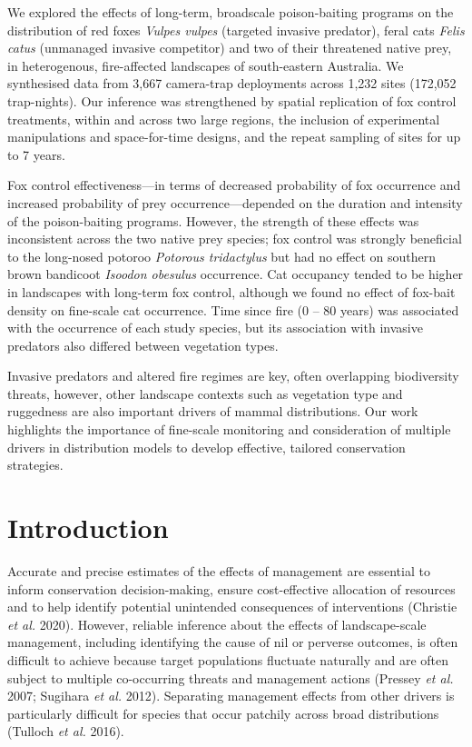 \documentclass[11pt,a4paper,titlepage,twoside,openright]{style/unimelbthesis}
\begin{document}
\begin{mainmatter}
We explored the effects of long-term, broadscale poison-baiting programs on the distribution of red foxes \emph{Vulpes vulpes} (targeted invasive predator), feral cats \emph{Felis catus} (unmanaged invasive competitor) and two of their threatened native prey, in heterogenous, fire-affected landscapes of south-eastern Australia. We synthesised data from 3,667 camera-trap deployments across 1,232 sites (172,052 trap-nights). Our inference was strengthened by spatial replication of fox control treatments, within and across two large regions, the inclusion of experimental manipulations and space-for-time designs, and the repeat sampling of sites for up to 7 years.

Fox control effectiveness---in terms of decreased probability of fox occurrence and increased probability of prey occurrence---depended on the duration and intensity of the poison-baiting programs. However, the strength of these effects was inconsistent across the two native prey species; fox control was strongly beneficial to the long-nosed potoroo \emph{Potorous tridactylus} but had no effect on southern brown bandicoot \emph{Isoodon obesulus} occurrence. Cat occupancy tended to be higher in landscapes with long-term fox control, although we found no effect of fox-bait density on fine-scale cat occurrence. Time since fire (0 -- 80 years) was associated with the occurrence of each study species, but its association with invasive predators also differed between vegetation types.

Invasive predators and altered fire regimes are key, often overlapping biodiversity threats, however, other landscape contexts such as vegetation type and ruggedness are also important drivers of mammal distributions. Our work highlights the importance of fine-scale monitoring and consideration of multiple drivers in distribution models to develop effective, tailored conservation strategies.

\newpage

\hypertarget{introduction-1}{%
\section{Introduction}\label{introduction-1}}

Accurate and precise estimates of the effects of management are essential to inform conservation decision-making, ensure cost-effective allocation of resources and to help identify potential unintended consequences of interventions (Christie \emph{et al.} 2020). However, reliable inference about the effects of landscape-scale management, including identifying the cause of nil or perverse outcomes, is often difficult to achieve because target populations fluctuate naturally and are often subject to multiple co-occurring threats and management actions (Pressey \emph{et al.} 2007; Sugihara \emph{et al.} 2012). Separating management effects from other drivers is particularly difficult for species that occur patchily across broad distributions (Tulloch \emph{et al.} 2016).


\end{mainmatter}
\end{document}
